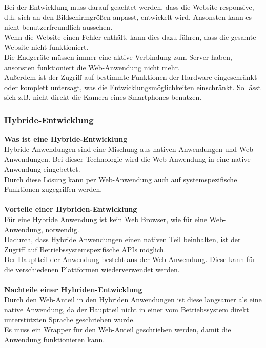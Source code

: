 \documentclass[ngerman]{article}
\begin{document}
    Bei der Entwicklung muss darauf geachtet werden, dass die Website responsive, d.h. sich an den Bildschirmgrößen anpasst, entwickelt wird. Ansonsten kann es nicht benutzerfreundlich aussehen.\\
    Wenn die Website einen Fehler enthält, kann dies dazu führen, dass die gesamte Website nicht funktioniert.\cite{DisadvantagesWebDevelopment}\\
    Die Endgeräte müssen immer eine aktive Verbindung zum Server haben, ansonsten funktioniert die Web-Anwendung nicht mehr.\\
    Außerdem ist der Zugriff auf bestimmte Funktionen der Hardware eingeschränkt oder komplett untersagt, was die Entwicklungsmöglichkeiten einschränkt. So lässt sich z.B. nicht direkt die Kamera eines Smartphones benutzen.\cite{ADWebDevelopment}
    \subsubsection{Hybride-Entwicklung}
    \textbf{Was ist eine Hybride-Entwicklung}\\
    Hybride-Anwendungen sind eine Mischung aus nativen-Anwendungen und Web-Anwendungen. Bei dieser Technologie wird die Web-Anwendung in eine native-Anwendung eingebettet.\\
    Durch diese Lösung kann per Web-Anwendung auch auf systemspezifische Funktionen zugegriffen werden.\cite{HybrideDevelopment}\\\\
    \textbf{Vorteile einer Hybriden-Entwicklung}\\
    Für eine Hybride Anwendung ist kein Web Browser, wie für eine Web-Anwendung, notwendig.\\
    Dadurch, dass Hybride Anwendungen einen nativen Teil beinhalten, ist der Zugriff auf Betriebssystemspezifische APIs möglich.\\
    Der Hauptteil der Anwendung besteht aus der Web-Anwendung. Diese kann für die verschiedenen Plattformen wiederverwendet werden.\cite{HybrideDevelopment}\\\\
    \textbf{Nachteile einer Hybriden-Entwicklung}\\
    Durch den Web-Anteil in den Hybriden Anwendungen ist diese langsamer als eine native Anwendung, da der Hauptteil nicht in einer vom Betriebssystem direkt unterstützten Sprache geschrieben wurde.\\
    Es muss ein Wrapper für den Web-Anteil geschrieben werden, damit die Anwendung funktionieren kann.\cite{HybrideDevelopment}
\end{document}
